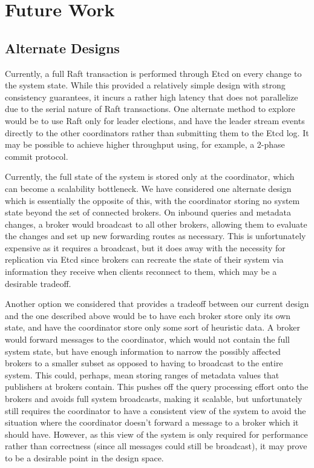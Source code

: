 \section{Future Work}


\subsection{Alternate Designs}
\label{subsec:alternate_designs}


Currently, a full Raft transaction is performed through Etcd on every change to the system state.
While this provided a relatively simple design with strong consistency guarantees, it incurs a rather high latency that does not parallelize due to the serial nature of Raft transactions.
One alternate method to explore would be to use Raft only for leader elections, and have the leader stream events directly to the other coordinators rather than submitting them to the Etcd log.
It may be possible to achieve higher throughput using, for example, a 2-phase commit protocol.

Currently, the full state of the system is stored only at the coordinator, which can become a scalability bottleneck.
We have considered one alternate design which is essentially the opposite of this, with the coordinator storing no system state beyond the set of connected brokers.
On inbound queries and metadata changes, a broker would broadcast to all other brokers, allowing them to evaluate the changes and set up new forwarding routes as necessary.
This is unfortunately expensive as it requires a broadcast, but it does away with the necessity for replication via Etcd since brokers can recreate the state of their system via information they receive when clients reconnect to them, which may be a desirable tradeoff.

Another option we considered that provides a tradeoff between our current design and the one described above would be to have each broker store only its own state, and have the coordinator store only some sort of heuristic data.
A broker would forward messages to the coordinator, which would not contain the full system state, but have enough information to narrow the possibly affected brokers to a smaller subset as opposed to having to broadcast to the entire system.
This could, perhaps, mean storing ranges of metadata values that publishers at brokers contain.
This pushes off the query processing effort onto the brokers and avoids full system broadcasts, making it scalable, but unfortunately still requires the coordinator to have a consistent view of the system to avoid the situation where the coordinator doesn't forward a message to a broker which it should have.
However, as this view of the system is only required for performance rather than correctness (since all messages could still be broadcast), it may prove to be a desirable point in the design space.

